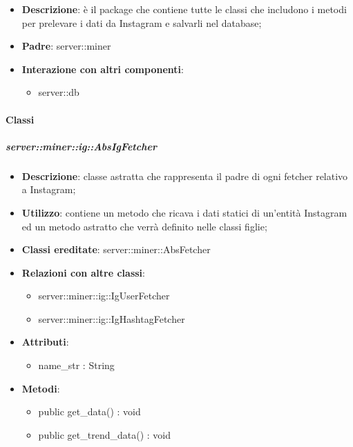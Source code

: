 \begin{itemize}
  \item \textbf{Descrizione}: è il package che contiene tutte le classi che includono i metodi per prelevare i dati da Instagram e salvarli nel database;
  \item \textbf{Padre}: server::miner
   \item \textbf{Interazione con altri componenti}:
  	\begin{itemize}
  		\item server::db
  	\end{itemize}
\end{itemize}

	\paragraph{Classi} %
	\subparagraph{server::miner::ig::AbsIgFetcher} %
		\label{subp:server_miner_ig_AbsIgFetcher}
			\begin{itemize}
				\item \textbf{Descrizione}: classe astratta che rappresenta il padre di ogni fetcher relativo a Instagram;
				\item \textbf{Utilizzo}: contiene un metodo che ricava i dati statici di un'entità Instagram ed un metodo astratto che verrà definito nelle classi figlie;
				\item \textbf{Classi ereditate}: server::miner::AbsFetcher
				\item \textbf{Relazioni con altre classi}:
					\begin{itemize}
						\item server::miner::ig::IgUserFetcher
						\item server::miner::ig::IgHashtagFetcher
					\end{itemize}
				\item \textbf{Attributi}:    
					\begin{itemize}
						\item name\_str : String
					\end{itemize}
				\item \textbf{Metodi}:  
					\begin{itemize}
						\item public get\_data() : void
						\item public get\_trend\_data() : void
					\end{itemize}
			\end{itemize}

